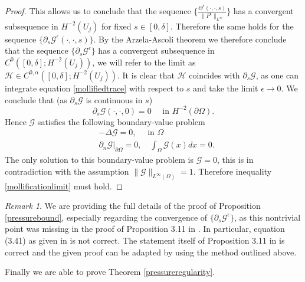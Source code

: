 \documentclass[12pt,a4paper]{article}
\theoremstyle{definition}
\theoremstyle{remark}
\newtheorem{remark}[theorem]{Remark}
\numberwithin{equation}{section}
\begin{document}
\begin{proof}
This allows us to conclude that the sequence $\bigg\{ \frac{\Theta^\epsilon (\cdot, \cdot, s)}{\lVert P^\epsilon \rVert_{L^\infty}} \bigg\}$ has a convergent subsequence in $H^{-2} (U_j)$ for fixed $s \in [0, \delta]$. Therefore the same holds for the sequence $\bigg\{ \partial_s \mathcal{G}^\epsilon (\cdot, \cdot, s) \bigg\}$. By the Arzela-Ascoli theorem we therefore conclude that the sequence $\{ \partial_s \mathcal{G}^\epsilon \}$ has a convergent subsequence in $C^0 ([0,\delta]; H^{-2} (U_j) )$, we will refer to the limit as $\mathcal{H} \in C^{0,\alpha} ([0,\delta]; H^{-2} (U_j) )$. It is clear that $\mathcal{H}$ coincides with $\partial_s \mathcal{G}$, as one can integrate equation \eqref{mollifiedtrace} with respect to $s$ and take the limit $\epsilon \rightarrow 0$.
We conclude that (as $\partial_s \mathcal{G}$ is continuous in $s$)
\begin{equation}
\partial_s \mathcal{G}(\cdot, \cdot, 0) = 0 \quad \text{ in } H^{-2} ( \partial \Omega).
\end{equation}
Hence $\mathcal{G}$ satisfies the following boundary-value problem
\begin{align}
&- \Delta \mathcal{G} = 0, \quad \text{ in } \Omega \\
&\partial_n \mathcal{G} \lvert_{\partial \Omega} = 0, \quad \int_\Omega \mathcal{G}(x) dx = 0. 
\end{align}
The only solution to this boundary-value problem is $\mathcal{G} = 0$, this is in contradiction with the assumption $\lVert \mathcal{G} \rVert_{L^\infty (\Omega)} = 1$. Therefore inequality \eqref{mollificationlimit} must hold.
\end{proof}
\begin{remark}
We are providing the full details of the proof of Proposition \ref{pressurebound}, especially regarding the convergence of $\{ \partial_s \mathcal{G}^\epsilon \}$, as this nontrivial point was missing in the proof of Proposition 3.11 in \cite{bardos2021}. In particular, equation (3.41) as given in \cite{bardos2021} is not correct. The statement itself of Proposition 3.11 in \cite{bardos2021} is correct and the given proof can be adapted by using the method outlined above. 
\end{remark}
Finally we are able to prove Theorem \ref{pressureregularity}.
\end{document}
